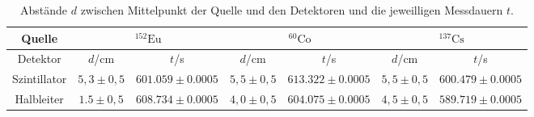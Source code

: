 \documentclass[ngerman,11pt]{article}
\begin{document}
\begin{multicols}{2}
	
	





























	\end{multicols}
\newpage
\begin{table}
	\centering
	\begin{tabular}{|c|c|c|c|c|c|c|}
		\hline
		Quelle & \multicolumn{2}{|c|}{$^{152}\mathrm{Eu}$}&\multicolumn{2}{|c|}{$^{60}\mathrm{Co}$}&\multicolumn{2}{|c|}{$^{137}\mathrm{Cs}$}\\ \hline
		Detektor& $d$/cm & $t$/s& $d$/cm & $t$/s& $d$/cm & $t$/s\\ \hline
		Szintillator & $5,3\pm0,5$ & $601.059 \pm0.0005$ & $5,5\pm 0,5$ & $613.322\pm0.0005$ & $5,5\pm0,5$ & $600.479 \pm0.0005$\\ \hline
		Halbleiter & $1.5\pm0,5$ & $608.734\pm 0.0005$ & $4,0\pm 0,5$ & $604.075\pm 0.0005$ & $4,5\pm0,5$ &$589.719 \pm 0.0005$ \\ \hline
	\end{tabular}
	\caption{Abst\"ande $d$ zwischen Mittelpunkt der Quelle und den Detektoren und die  jeweilligen Messdauern $t$.}
\end{table}
\end{document}

